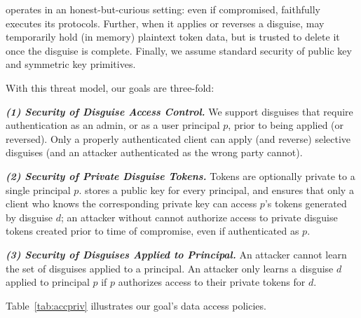 %
\sys operates in an honest-but-curious setting: even if compromised, \sys faithfully executes
its protocols.
%
Further, when it applies or reverses a disguise, \sys may temporarily
hold (in memory) plaintext token data, but is trusted to delete it once the disguise is
complete.
%
Finally, we assume standard security of public key and symmetric key primitives.

With this threat model, our goals are three-fold: 

\vspace{6pt}\noindent\textbf{\emph{(1) Security of Disguise Access Control.}}
We support disguises that require authentication as an admin, or as a user principal $p$, prior to being applied (or
reversed). Only a properly authenticated client can apply (and reverse) selective disguises
(and an attacker authenticated as the wrong party cannot).

\vspace{6pt}\noindent\textbf{\emph{(2) Security of Private Disguise Tokens.}}
Tokens are optionally private to a single principal $p$. 
\sys stores a public key  for every principal, and ensures that 
only a client who knows the corresponding private key  can access $p$'s tokens generated by
disguise $d$; an attacker without  cannot authorize access to private disguise tokens
created prior to time of compromise, even if authenticated as $p$.

\vspace{6pt}\noindent\textbf{\emph{(3) Security of Disguises Applied to Principal.}}
An attacker cannot learn the set of disguises applied to a principal. An attacker only learns a
disguise $d$ applied to principal $p$ if $p$ authorizes access to their private tokens for $d$.
%

\vspace{6pt}\noindent
Table~\ref{tab:accpriv} illustrates our goal's data access policies.

